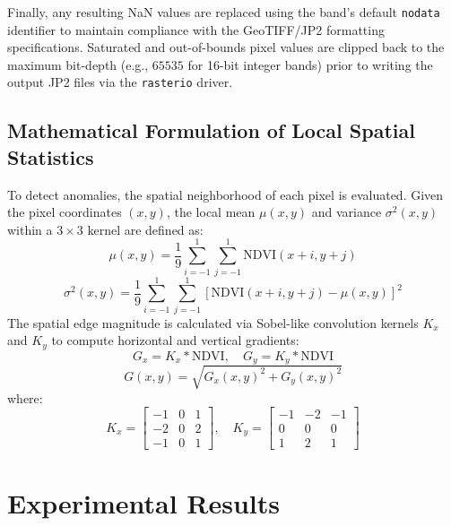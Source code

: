 \documentclass[10pt,conference,compsoc]{IEEEtran}
\begin{document}
Finally, any resulting NaN values are replaced using the band's default \texttt{nodata} identifier to maintain compliance with the GeoTIFF/JP2 formatting specifications. Saturated and out-of-bounds pixel values are clipped back to the maximum bit-depth (e.g., $65535$ for 16-bit integer bands) prior to writing the output JP2 files via the \texttt{rasterio} driver.

\subsection{Mathematical Formulation of Local Spatial Statistics}
To detect anomalies, the spatial neighborhood of each pixel is evaluated. Given the pixel coordinates $(x,y)$, the local mean $\mu(x,y)$ and variance $\sigma^2(x,y)$ within a $3\times3$ kernel are defined as:
\begin{equation}
\mu(x,y) = \frac{1}{9}\sum_{i=-1}^{1}\sum_{j=-1}^{1} \mathrm{NDVI}(x+i, y+j)
\end{equation}
\begin{equation}
\sigma^2(x,y) = \frac{1}{9}\sum_{i=-1}^{1}\sum_{j=-1}^{1} \left[ \mathrm{NDVI}(x+i, y+j) - \mu(x,y) \right]^2
\end{equation}
The spatial edge magnitude is calculated via Sobel-like convolution kernels $K_x$ and $K_y$ to compute horizontal and vertical gradients:
\begin{equation}
G_x = K_x * \mathrm{NDVI}, \quad G_y = K_y * \mathrm{NDVI}
\end{equation}
\begin{equation}
G(x,y) = \sqrt{G_x(x,y)^2 + G_y(x,y)^2}
\end{equation}
where:
\[
K_x = \begin{bmatrix} -1 & 0 & 1 \\ -2 & 0 & 2 \\ -1 & 0 & 1 \end{bmatrix}, \quad 
K_y = \begin{bmatrix} -1 & -2 & -1 \\ 0 & 0 & 0 \\ 1 & 2 & 1 \end{bmatrix}
\]


\section{Experimental Results}
\end{document}
